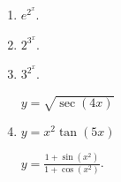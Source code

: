 \begin{multicols}{2}
\begin{enumerate}[ref={\fcProblemRef}]
\item $e^{2^x}$.


\item $2^{3^x}$.

\item $3^{2^x}$.

 \label{problemd/dx(sqrt(sec(4x)))}  $y = \sqrt{\sec (4x)}$

\item \label{problemd/dx(x^2tan(5x))} $y = x^2\tan (5x)$

 \label{problemd/dx((1+sin(x^2))/(1+cos(x^2)))}  $\displaystyle y = \frac{1+\sin \left(x^2\right)}{1+\cos \left(x^2\right)}$.

\end{enumerate}
\end{multicols}
